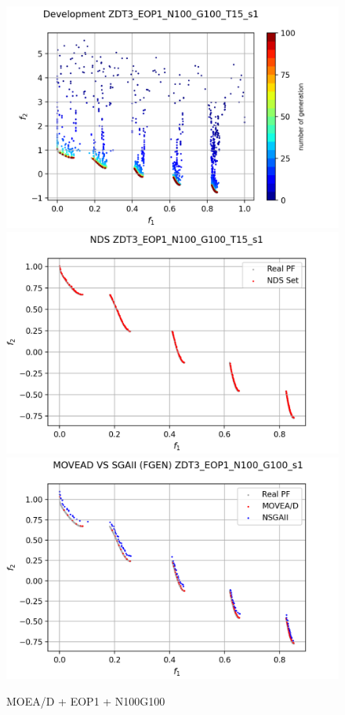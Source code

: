 \begin{minipage}[H]{0.47\linewidth}
    \begin{figure}[H]
        \centering
        \includegraphics[scale=0.55]{figures/ZDT3_EOP1_N100_G100_T15/s1_dev.png}\\
        \includegraphics[scale=0.5]{figures/ZDT3_EOP1_N100_G100_T15/s1_nds.png}\\
        \includegraphics[scale=0.5]{figures/ZDT3_EOP1_N100_G100_T15/s1_comp.png}\\
        \caption{MOEA/D + EOP1 + N100G100}
        \label{fig:2}
    \end{figure}

    \vfill
    \end{minipage}\\

